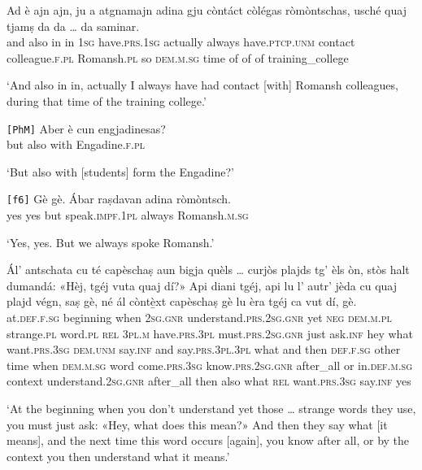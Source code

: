 \begin{linenumbers}
\gll    Ad è ajn ajn, ju a atgnamajn adina gju còntáct\footnotemark{} còlégas ròmòntschas, usché quaj tjamṣ da da … da saminar.\\
 and also in in \textsc{1sg} have.\textsc{prs.1sg} actually always have.\textsc{ptcp.unm} contact colleague.\textsc{f.pl} Romansh.\textsc{pl} so \textsc{dem.m.sg} time of of {} of training\_college\\
\end{linenumbers}
\medskip
\glt `And also in in, actually I always have had contact [with] Romansh colleagues, during that time of the training college.'
\medskip

\begin{linenumbers}
\gll    \texttt{[PhM]} Aber è cun engjadinesas?\\
{} but also with Engadine.\textsc{f.pl}\\
\end{linenumbers}
\medskip
\glt `But also with [students] form the Engadine?'
\medskip

\begin{linenumbers}
\gll    \texttt{[f6]} Gè gè. Ábar raṣdavan adina ròmòntsch.\\
{} yes yes but speak.\textsc{impf.1pl} always Romansh.\textsc{m.sg}\\
\end{linenumbers}
\medskip
\glt `Yes, yes. But we always spoke Romansh.'
\medskip

\begin{linenumbers}
\gll    Ál’ antschata cu té capèschaṣ aun bigja quèls … curjòs plajds tg’ èls òn, stòs halt dumandá: «Hèj, tgéj vuta quaj dí?» Api diani tgéj, api lu l’ autr’ jèda cu quaj plajd végn, saṣ gè, né ál còntè̱xt capèschaṣ gè lu èra tgéj ca vut dí, gè.\\
at.\textsc{def.f.sg} beginning when \textsc{2sg.gnr} understand.\textsc{prs.2sg.gnr} yet \textsc{neg} \textsc{dem.m.pl} {} strange.\textsc{pl} word.\textsc{pl} \textsc{rel} \textsc{3pl.m} have.\textsc{prs.3pl} must.\textsc{prs.2sg.gnr} just ask.\textsc{inf} hey what want.\textsc{prs.3sg} \textsc{dem.unm} say.\textsc{inf} and say.\textsc{prs.3pl.3pl} what and then \textsc{def.f.sg} other time when \textsc{dem.m.sg} word come.\textsc{prs.3sg} know.\textsc{prs.2sg.gnr} after\_all or in.\textsc{def.m.sg} context understand.\textsc{2sg.gnr} after\_all then also what \textsc{rel} want.\textsc{prs.3sg} say.\textsc{inf} yes\\
\end{linenumbers}
\medskip
\glt `At the beginning when you don’t understand yet those … strange words they use, you must just ask: «Hey, what does this mean?» And then they say what [it means], and the next time this word occurs [again], you know after all, or by the context you then understand what it means.'
\medskip

